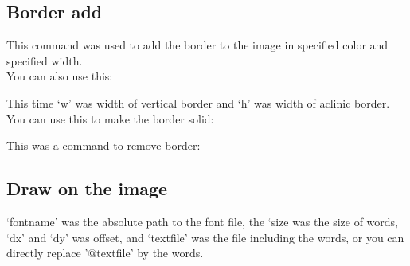 \documentclass[12pt]{article}
\begin{document}
\subsection{Border add}
{\centering{}\par}\vspace{5mm}

This command was used to add the border to the image in specified color and specified width.\\

You can also use this:\vspace{5mm}

{\centering{}\par}\vspace{5mm}

This time `w' was width of vertical border and `h' was width of aclinic border.\\

You can use this to make the border solid:\vspace{5mm}

{\centering{}\par}\vspace{5mm}

This was a command to remove border:\\

{\centering{}\par}

\subsection{Draw on the image}
{\centering{}\par}\vspace{5mm}

`fontname' was the absolute path to the font file, the `size was the size of words, `dx' and `dy' was offset, and `textfile' was the file including the words, or you can directly replace '@textfile' by the words.\vspace{5mm}

{\centering{}\par}\vspace{5mm}
\end{document}
